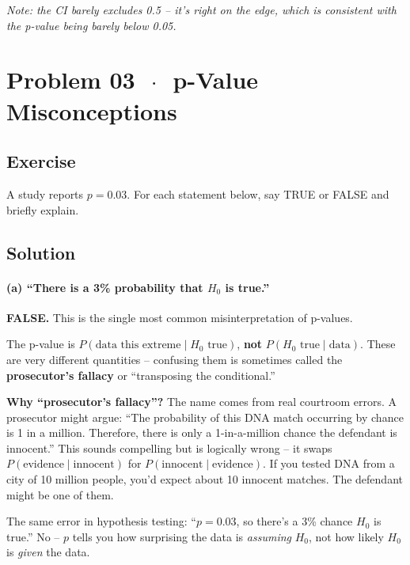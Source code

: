 \documentclass[11pt]{article}
\begin{document}
\textit{Note: the CI barely excludes 0.5 -- it's right on the edge, which is consistent with the p-value being barely below 0.05.}

\section*{Problem 03 \texorpdfstring{$\,\cdot\,$}{-} p-Value Misconceptions}

\subsection*{Exercise}

A study reports $p = 0.03$. For each statement below, say TRUE or FALSE and briefly explain.

\subsection*{Solution}

\paragraph{(a) ``There is a 3\% probability that $H_0$ is true.''}

\textbf{FALSE.} This is the single most common misinterpretation of p-values.

The p-value is $P(\text{data this extreme} \mid H_0 \text{ true})$, \textbf{not} $P(H_0 \text{ true} \mid \text{data})$. These are very different quantities -- confusing them is sometimes called the \textbf{prosecutor's fallacy} or ``transposing the conditional.''

\textbf{Why ``prosecutor's fallacy''?} The name comes from real courtroom errors. A prosecutor might argue: ``The probability of this DNA match occurring by chance is 1 in a million. Therefore, there is only a 1-in-a-million chance the defendant is innocent.'' This sounds compelling but is logically wrong -- it swaps $P(\text{evidence} \mid \text{innocent})$ for $P(\text{innocent} \mid \text{evidence})$. If you tested DNA from a city of 10 million people, you'd expect about 10 innocent matches. The defendant might be one of them.

The same error in hypothesis testing: ``$p = 0.03$, so there's a 3\% chance $H_0$ is true.'' No -- $p$ tells you how surprising the data is \textit{assuming} $H_0$, not how likely $H_0$ is \textit{given} the data.
\end{document}
